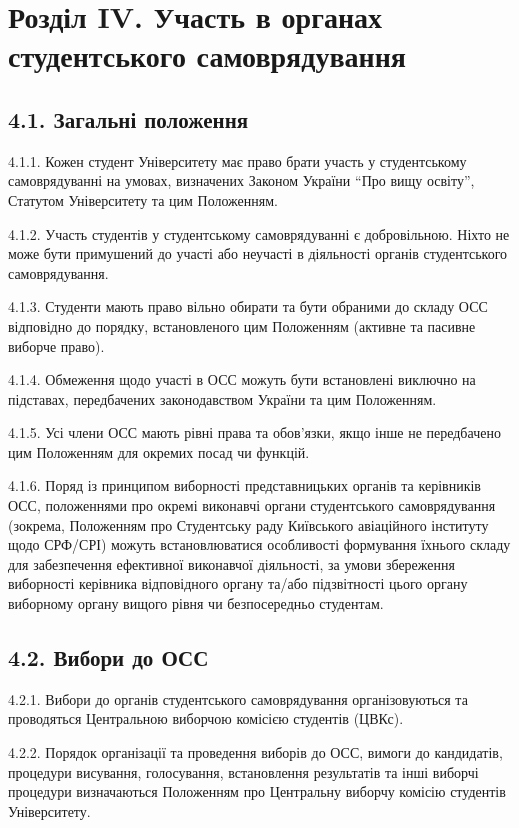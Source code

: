 \section*{Розділ IV. Участь в органах студентського самоврядування}

\subsection*{4.1. Загальні положення}
    4.1.1. Кожен студент Університету має право брати участь у студентському самоврядуванні на умовах, визначених Законом України ``Про вищу освіту'', Статутом Університету та цим Положенням.

    4.1.2. Участь студентів у студентському самоврядуванні є добровільною. Ніхто не може бути примушений до участі або неучасті в діяльності органів студентського самоврядування.

    4.1.3. Студенти мають право вільно обирати та бути обраними до складу ОСС відповідно до порядку, встановленого цим Положенням (активне та пасивне виборче право).

    4.1.4. Обмеження щодо участі в ОСС можуть бути встановлені виключно на підставах, передбачених законодавством України та цим Положенням.

    4.1.5. Усі члени ОСС мають рівні права та обов'язки, якщо інше не передбачено цим Положенням для окремих посад чи функцій.

    4.1.6. Поряд із принципом виборності представницьких органів та керівників ОСС, положеннями про окремі виконавчі органи студентського самоврядування (зокрема, Положенням про Студентську раду Київського авіаційного інституту щодо СРФ/СРІ) можуть встановлюватися особливості формування їхнього складу для забезпечення ефективної виконавчої діяльності, за умови збереження виборності керівника відповідного органу та/або підзвітності цього органу виборному органу вищого рівня чи безпосередньо студентам.

\subsection*{4.2. Вибори до ОСС}
    4.2.1. Вибори до органів студентського самоврядування організовуються та проводяться Центральною виборчою комісією студентів (ЦВКс).

    4.2.2. Порядок організації та проведення виборів до ОСС, вимоги до кандидатів, процедури висування, голосування, встановлення результатів та інші виборчі процедури визначаються Положенням про Центральну виборчу комісію студентів Університету.

